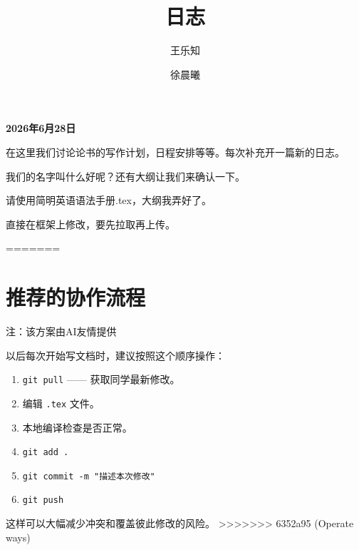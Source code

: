 \documentclass[UTF8]{ctexart}
\title{日志}
\author{王乐知 \and 徐晨曦}
\begin{document}
\maketitle

\noindent\textbf{2026年6月28日}

\vspace{1em}

在这里我们讨论论书的写作计划，日程安排等等。每次补充开一篇新的日志。

我们的名字叫什么好呢？还有大纲让我们来确认一下。

请使用简明英语语法手册.tex，大纲我弄好了。

直接在框架上修改，要先拉取再上传。

=======
\section*{推荐的协作流程}

注：该方案由AI友情提供

以后每次开始写文档时，建议按照这个顺序操作：

\begin{enumerate}
    \item \texttt{git pull} —— 获取同学最新修改。
    \item 编辑 \texttt{.tex} 文件。
    \item 本地编译检查是否正常。
    \item \texttt{git add .}
    \item \texttt{git commit -m "描述本次修改"}
    \item \texttt{git push}
\end{enumerate}

这样可以大幅减少冲突和覆盖彼此修改的风险。
>>>>>>> 6352a95 (Operate ways)
\end{document}
